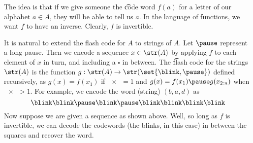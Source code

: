 The idea is that if we give someone the \t{code word} $f(a)$ for a letter of our alphabet $a \in A$, they will be able to tell us $a$.
In the language of functions, we want $f$ to have an inverse.
Clearly, $f$ is invertible.

It is natural to extend the flash code for $A$ to strings of $A$.
Let $\pause$ represent a long pause.
Then we encode a sequence $x \in \str(A)$ by applying $f$ to each element of $x$ in turn, and including a $\square$ in between.
The \t{flash code} for the strings $\str(A)$ is the function $g: \str(A) \to \str(\set{\blink, \pause})$ defined recursively, as $g(x) = f(x_1)$ if $\num{x} = 1$ and $g(x) = f(x_1)\pause g(x_{2:n})$ when $\num{x} > 1$.
For example, we encode the word (string) $(b,a,d)$ as
\begin{equation}
  \label{ref:blinks}\blink
\blink
\pause
\blink
\pause
\blink
\blink
\blink
\blink\end{equation}
Now suppose we are given a sequence as shown above.
Well, so long as $f$ is invertible, we can decode the codewords (the blinks, in this case) in between the squares and recover the word.
